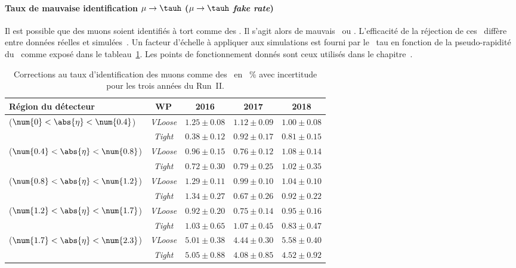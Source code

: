 \paragraph{Taux de mauvaise identification $\mu\to\tauh$ (\emph{$\mu\to\tauh$ fake rate})}
Il est possible que des muons soient identifiés à tort comme des \tauh.
Il s'agit alors de mauvais \tauh\ ou \og \ftauhs \fg{}.
L'efficacité de la réjection de ces \ftauhs\ diffère entre données réelles et simulées~\cite{TauPOG}.
Un facteur d'échelle à appliquer aux simulations est fourni par le \POG\ tau en fonction de la pseudo-rapidité du \ftauh\ comme exposé dans le tableau~\ref{tab-chapter-CMS-section-taus-corrections-mu_to_tau_SF}.
Les points de fonctionnement donnés sont ceux utilisés dans le chapitre~.
\begin{table}[h]
\centering
\begin{tabular}{lcccc}
\toprule
Région du détecteur & WP & 2016 & 2017 & 2018 \\
\midrule
($\num{0}<\abs{\eta}<\num{0.4}$) & \emph{VLoose} & $\num{1.25}\pm\num{0.08}$ & $\num{1.12}\pm\num{0.09}$ & $\num{1.00}\pm\num{0.08}$ \\
 & \emph{Tight} & $\num{0.38}\pm\num{0.12}$ & $\num{0.92}\pm\num{0.17}$ & $\num{0.81}\pm\num{0.15}$ \\
($\num{0.4}<\abs{\eta}<\num{0.8}$) & \emph{VLoose} & $\num{0.96}\pm\num{0.15}$ & $\num{0.76}\pm\num{0.12}$ & $\num{1.08}\pm\num{0.14}$ \\
 & \emph{Tight} & $\num{0.72}\pm\num{0.30}$ & $\num{0.79}\pm\num{0.25}$ & $\num{1.02}\pm\num{0.35}$ \\
($\num{0.8}<\abs{\eta}<\num{1.2}$) & \emph{VLoose} & $\num{1.29}\pm\num{0.11}$ & $\num{0.99}\pm\num{0.10}$ & $\num{1.04}\pm\num{0.10}$ \\
 & \emph{Tight} & $\num{1.34}\pm\num{0.27}$ & $\num{0.67}\pm\num{0.26}$ & $\num{0.92}\pm\num{0.22}$ \\
($\num{1.2}<\abs{\eta}<\num{1.7}$) & \emph{VLoose} & $\num{0.92}\pm\num{0.20}$ & $\num{0.75}\pm\num{0.14}$ & $\num{0.95}\pm\num{0.16}$ \\
 & \emph{Tight} & $\num{1.03}\pm\num{0.65}$ & $\num{1.07}\pm\num{0.45}$ & $\num{0.83}\pm\num{0.47}$ \\
($\num{1.7}<\abs{\eta}<\num{2.3}$) & \emph{VLoose} & $\num{5.01}\pm\num{0.38}$ & $\num{4.44}\pm\num{0.30}$ & $\num{5.58}\pm\num{0.40}$ \\
 & \emph{Tight} & $\num{5.05}\pm\num{0.88}$ & $\num{4.08}\pm\num{0.85}$ & $\num{4.52}\pm\num{0.92}$ \\
\bottomrule
\end{tabular}
\caption[Corrections au taux d'identification des muons comme des \tauh.]{Corrections au taux d'identification des muons comme des \tauh\ en \SI{}{\%} avec incertitude pour les trois années du Run~II.}
\label{tab-chapter-CMS-section-taus-corrections-mu_to_tau_SF}
\end{table}
